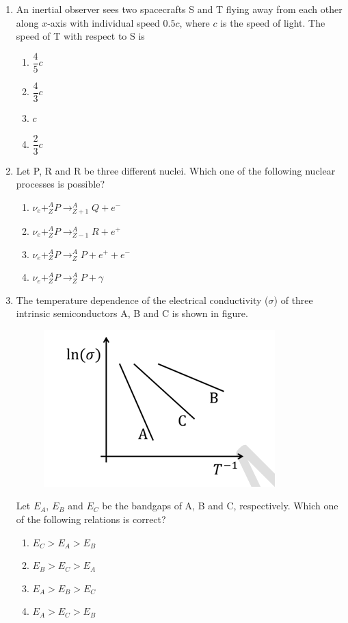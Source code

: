 \documentclass[journal,12pt,onecolumn]{IEEEtran}
\theoremstyle{remark}
\begin{document}
\begin{enumerate}
\begin{figure}[H]
    \caption*{}
    \label{fig: Q24}
\end{figure}
\item An inertial observer sees two spacecrafts S and T flying away from each other along $x$-axis with individual speed $0.5c$, where $c$ is the speed of light. The speed of T with respect to S is
\begin{enumerate}
    \item $\dfrac{4}{5} c$
    \item $\dfrac{4}{3} c$
    \item $c$
    \item $\dfrac{2}{3} c$
\end{enumerate}


\item Let P, R and R be three different nuclei. Which one of the following nuclear processes is possible?
\begin{enumerate}
    \item $\nu_e + ^{A}_{Z}P \rightarrow ^{A}_{Z+1}Q + e^{-}$
    \item $\nu_e + ^{A}_{Z}P \rightarrow ^{A}_{Z-1}R + e^{+}$
    \item $\nu_e + ^{A}_{Z}P \rightarrow ^{A}_{Z}P + e^{+} + e^{-}$
    \item $\nu_e + ^{A}_{Z}P \rightarrow ^{A}_{Z}P + \gamma$
\end{enumerate}

\item The temperature dependence of the electrical conductivity ($\sigma$) of three intrinsic semiconductors A, B and C is shown in figure.
\begin{figure}[H]
    \centering
    \includegraphics[width = 0.5\columnwidth]{fig/Q27.png}
    \caption*{}
    \label{fig: Q27}
\end{figure}
Let $E_A$, $E_B$ and $E_C$ be the bandgaps of A, B and C, respectively. Which one of the following relations is correct?
\begin{enumerate}
    \item $E_C > E_A > E_B$
    \item $E_B > E_C > E_A$
    \item $E_A > E_B > E_C$
    \item $E_A > E_C > E_B$
\end{enumerate}


\end{enumerate}
\end{document}
